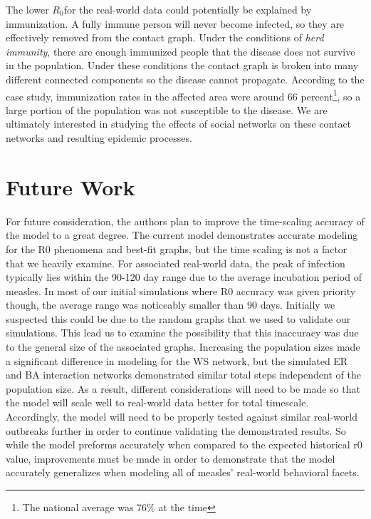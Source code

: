 \documentclass[conference]{IEEEtran}
\newcommand{\ro}{$R_0$}
\begin{document}
The lower \ro for the real-world data could potentially be explained by immunization. A fully immune person will never become infected, so they are effectively removed from the contact graph. Under the conditions of \textit{herd immunity}, there are enough immunized people that the disease does not survive in the population. Under these conditions the contact graph is broken into many different connected components so the disease cannot propagate.\cite{pinkbookMeasles} According to the case study, immunization rates in the affected area were around 66 percent\footnote{The national average was 76\% at the time}, so a large portion of the population was not susceptible to the disease. We are ultimately interested in studying the effects of social networks on these contact networks and resulting epidemic processes. 

\section{Future Work} %
For future consideration, the authors plan to improve the time-scaling accuracy of the model to a great degree. The current model demonstrates accurate modeling for the R0 phenomena and best-fit graphs, but the time scaling is not a factor that we heavily examine. For associated real-world data,\cite{Jasem2012Elsevier,Mcbrein2003,Sugarman2010} the peak of infection typically lies within the 90-120 day range due to the average incubation period of measles. In most of our initial simulations where R0 accuracy was given priority though, the average range was noticeably smaller than 90 days. Initially we suspected this could be due to the random graphs that we used to validate our simulations. This lead us to examine the possibility that this inaccuracy was due to the general size of the associated graphs. Increasing the population sizes made a significant difference in modeling for the WS network, but the simulated ER and BA interaction networks demonstrated similar total steps independent of the population size. As a result, different considerations will need to be made so that the model will scale well to real-world data better for total timescale. Accordingly, the model will need to be properly tested against similar real-world outbreaks further in order to continue validating the demonstrated results. So while the model preforms accurately when compared to the expected historical r0 value, improvements must be made in order to demonstrate that the model accurately generalizes when modeling all of measles' real-world behavioral facets. 
\end{document}
